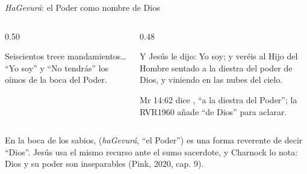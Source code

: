\begin{frame}{\emph{HaGevurá}: el Poder como nombre de Dios}
\begin{columns}[c,onlytextwidth]
\begin{column}{0.50\textwidth}
\begin{cita}[colback=dorado!10!papiro,colframe=dorado!80!azul]Seiscientos trece mandamientos\ldots{} ``Yo soy'' y ``No tendrás'' los oímos de la boca del Poder.\end{cita}
\begin{center}\scriptsize{}\end{center}
\end{column}
\begin{column}{0.48\textwidth}
\begin{cita}Y Jesús le dijo: Yo soy; y veréis al Hijo del Hombre sentado a la diestra del poder de Dios, y viniendo en las nubes del cielo.\end{cita}
\scriptsize Mr 14:62 dice , ``a la diestra del Poder''; la RVR1960 añade ``de Dios'' para aclarar.
\end{column}
\end{columns}\par\medskip
\small En la boca de los sabios,  (\emph{haGevurá}, ``el Poder'') es una forma reverente de decir ``Dios''. Jesús usa el mismo recurso ante el sumo sacerdote, y Charnock lo nota: Dios y su poder son inseparables (Pink, 2020, cap. 9).\par\smallskip
{}
\end{frame}

